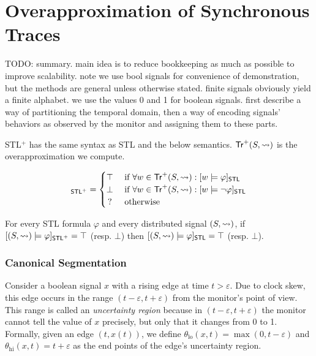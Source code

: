 \section{Overapproximation of Synchronous Traces} \label{sec:approach}
\alert{TODO: summary. main idea is to reduce bookkeeping as much as possible to improve scalability. note we use bool signals for convenience of demonstration, but the methods are general unless otherwise stated. finite signals obviously yield a finite alphabet. we use the values 0 and 1 for boolean signals. first describe a way of partitioning the temporal domain, then a way of encoding signals' behaviors as observed by the monitor and assigning them to these parts.}

STL$^+$ has the same syntax as STL and the below semantics.
$\mathsf{Tr}^+(S,{\rightsquigarrow})$ is the overapproximation we compute.

\small
\begin{equation*}
	[(S,{\hb}) \models \varphi]_{\mathsf{STL}^+} = 
	\begin{cases}
		\top & \text{ if } \forall w \in \tr^+(S,{\hb}) : [w \models \varphi]_{\mathsf{STL}} \\
		\bot & \text{ if } \forall w \in \tr^+(S,{\hb}) : [w \models \lnot\varphi]_{\mathsf{STL}} \\
		\,? & \text{ otherwise}
	\end{cases}
\end{equation*}
\normalsize

\begin{theorem}
	For every STL formula $\varphi$ and every distributed signal $(S,{\rightsquigarrow})$, if $[(S,{\rightsquigarrow}) \models \varphi]_{\mathsf{STL}^+} = \top$ (resp. $\bot$) then $[(S,{\rightsquigarrow}) \models \varphi]_{\mathsf{STL}} = \top$ (resp. $\bot$).
\end{theorem}

\subsubsection{Canonical Segmentation}
Consider a boolean signal $x$ with a rising edge at time $t > \varepsilon$.
Due to clock skew, this edge occurs in the range $(t - \varepsilon, t + \varepsilon)$ from the monitor's point of view.
This range is called an \emph{uncertainty region} because in $(t - \varepsilon, t + \varepsilon)$ the monitor cannot tell the value of $x$ precisely, but only that it changes from 0 to 1.
Formally, given an edge $(t, x(t))$, we define $\theta_{\text{lo}}(x,t) = \max(0, t - \varepsilon)$ and $\theta_{\text{hi}}(x,t) = t + \varepsilon$ as the end points of the edge's uncertainty region.

